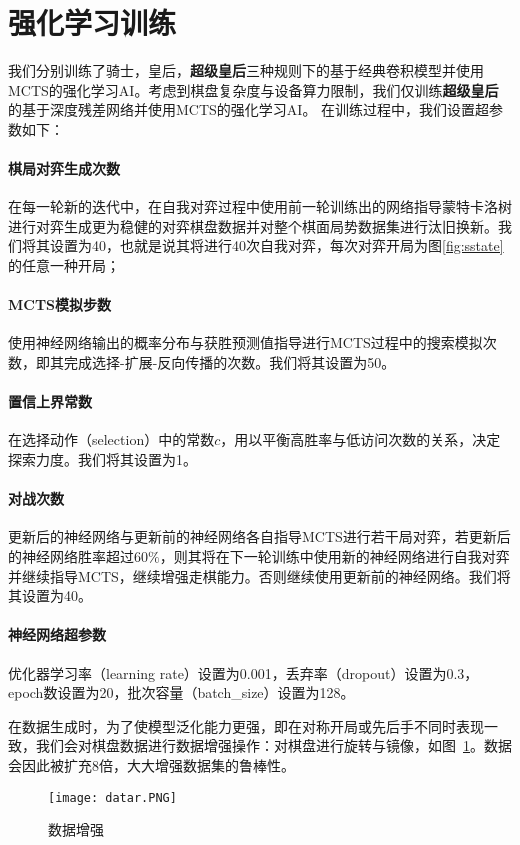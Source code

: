 \section{强化学习训练}
我们分别训练了骑士，皇后，\textbf{超级皇后}三种规则下的基于经典卷积模型并使用MCTS的强化学习AI。考虑到棋盘复杂度与设备算力限制，我们仅训练\textbf{超级皇后}的基于深度残差网络并使用MCTS的强化学习AI。
在训练过程中，我们设置超参数如下：
\paragraph{棋局对弈生成次数}
在每一轮新的迭代中，在自我对弈过程中使用前一轮训练出的网络指导蒙特卡洛树进行对弈生成更为稳健的对弈棋盘数据并对整个棋面局势数据集进行汰旧换新。我们将其设置为40，也就是说其将进行40次自我对弈，每次对弈开局为图\ref{fig:sstate}的任意一种开局；
\paragraph{MCTS模拟步数}
使用神经网络输出的概率分布与获胜预测值指导进行MCTS过程中的搜索模拟次数，即其完成选择-扩展-反向传播的次数。我们将其设置为50。
\paragraph{置信上界常数}
在选择动作（selection）中的常数$c$，用以平衡高胜率与低访问次数的关系，决定探索力度。我们将其设置为1。
\paragraph{对战次数}
更新后的神经网络与更新前的神经网络各自指导MCTS进行若干局对弈，若更新后的神经网络胜率超过$60\%$，则其将在下一轮训练中使用新的神经网络进行自我对弈并继续指导MCTS，继续增强走棋能力。否则继续使用更新前的神经网络。我们将其设置为40。
\paragraph{神经网络超参数}
优化器学习率（learning rate）设置为0.001，丢弃率（dropout）设置为0.3，epoch数设置为20，批次容量（batch\_size）设置为128。

在数据生成时，为了使模型泛化能力更强，即在对称开局或先后手不同时表现一致，我们会对棋盘数据进行数据增强操作：对棋盘进行旋转与镜像，如图~\ref{fig:datar}。数据会因此被扩充8倍，大大增强数据集的鲁棒性。
\begin{figure}[H]
    \centering
    \texttt{[image: datar.PNG]}
    \caption[datar]{%
        数据增强%
      }
    \label{fig:datar}
\end{figure}
